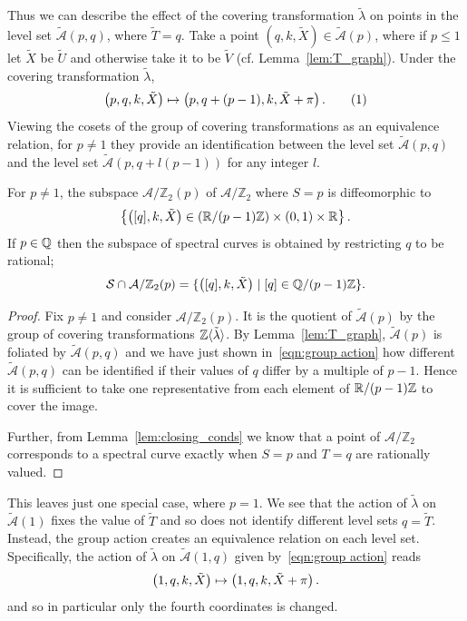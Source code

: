 \documentclass{article}
\begin{document}
Thus we can describe the effect of the covering transformation $\tilde{\lambda}$ on points in the level set $\mathcal{\tilde{A}}(p,q)$, where $\tilde{T} = q$. Take a point $(q,k,\tilde{X}) \in \mathcal{\tilde{A}}(p)$, where if $p\leq 1$ let $\tilde{X}$ be $\tilde{U}$ and otherwise take it to be $\tilde{V}$ (cf. Lemma~\ref{lem:T_graph}). Under the covering transformation $\tilde{\lambda}$,
\[
\bra{p,q,k,\tilde{X}} \mapsto \bra{p, q + (p-1), k, \tilde{X} + \pi}.
\labelthis{eqn:group action}
\]
Viewing the cosets of the group of covering transformations as an equivalence relation, for $p\neq 1$ they provide an identification between the level set $\mathcal{\tilde{A}}(p,q)$ and the level set $\mathcal{\tilde{A}}(p,q + l(p-1))$ for any integer $l$.

\begin{thm}
\label{thm:topology_curves}
For $p\neq 1$, the subspace $\mathcal{A}/\mathbb{Z}_2(p)$ of $\mathcal{A}/\mathbb{Z}_2$ where $S=p$ is diffeomorphic to
\[
\left\{ \left([q],k,\tilde{X}\right) \in \left(\mathbb{R}/ (p-1)\mathbb{Z}\right) \times (0,1) \times \mathbb{R} \right\}.
\]
If $p\in\mathbb{Q}$ then the subspace of spectral curves is obtained by restricting $q$ to be rational;
\[
\mathcal{S} \cap \mathcal{A}/\mathbb{Z}_2(p)  = \{ \left([q],k,\tilde{X}\right) \mid [q] \in \mathbb{Q}/ (p-1)\mathbb{Z} \}.
\]
\begin{proof}
Fix $p\neq 1$ and consider $\mathcal{A}/\mathbb{Z}_2(p)$. It is the quotient of $\mathcal{\tilde{A}}(p)$ by the group of covering transformations $\mathbb{Z}\langle\tilde{\lambda}\rangle$. By Lemma~\ref{lem:T_graph}, $\mathcal{\tilde{A}}(p)$ is foliated by $\mathcal{\tilde{A}}(p,q)$ and we have just shown in~\eqref{eqn:group action} how different $\mathcal{\tilde{A}}(p,q)$ can be identified if their values of $q$ differ by a multiple of $p-1$. Hence it is sufficient to take one representative from each element of $\mathbb{R}/(p-1)\mathbb{Z}$ to cover the image.

Further, from Lemma~\ref{lem:closing_conds} we know that a point of $\mathcal{A}/\mathbb{Z}_2$ corresponds to a spectral curve exactly when $S=p$ and $T=q$ are rationally valued.
\end{proof}
\end{thm}

This leaves just one special case, where $p=1$. We see that the action of $\tilde{\lambda}$ on $\mathcal{\tilde{A}}(1)$ fixes the value of $\tilde{T}$ and so does not identify different level sets $q=\tilde{T}$. Instead, the group action creates an equivalence relation on each level set. Specifically, the action of $\tilde{\lambda}$ on $\mathcal{\tilde{A}}(1,q)$ given by~\eqref{eqn:group action} reads
\[
\left(1,q,k,\tilde{X}\right) \mapsto \left(1, q, k, \tilde{X} + \pi\right).
\]
and so in particular only the fourth coordinates is changed.
\end{document}
